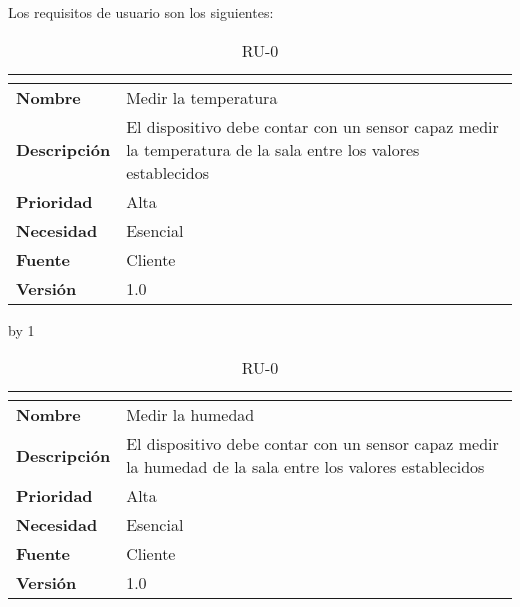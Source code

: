 Los requisitos de usuario son los siguientes:
\newcount\ru
{}
\begin{table}[H]
	\caption{RU-0\number\ru}
	\begin{tabular}{|l|p{}|}
		\hline
		\multicolumn{2}{|c|}{\cellcolor[HTML]{BFBFBF}{\color[HTML]{000000} \textbf{RU-0\number\ru}}} \\ \hline
		\textbf{Nombre}      & Medir la temperatura                                                                                          \\ \hline
		\textbf{Descripción} & El dispositivo debe contar con un sensor capaz medir la temperatura de la sala entre los valores establecidos \\ \hline
		\textbf{Prioridad}   & Alta                                                                                                          \\ \hline
		\textbf{Necesidad}   & Esencial                                                                                                      \\ \hline
		\textbf{Fuente}      & Cliente                                                                                                       \\ \hline
		\textbf{Versión}     & 1.0                                                                                                           \\ \hline
	\end{tabular}
\end{table}
\advance\ru by 1
\begin{table}[H]
	\caption{RU-0\number\ru}
	\begin{tabular}{|l|p{}|}
		\hline
		\multicolumn{2}{|c|}{\cellcolor[HTML]{BFBFBF}{\color[HTML]{000000} \textbf{RU-0\number\ru}}} \\ \hline
		\textbf{Nombre}      & Medir la humedad                                                                                          \\ \hline
		\textbf{Descripción} & El dispositivo debe contar con un sensor capaz medir la humedad de la sala entre los valores establecidos \\ \hline
		\textbf{Prioridad}   & Alta                                                                                                      \\ \hline
		\textbf{Necesidad}   & Esencial                                                                                                  \\ \hline
		\textbf{Fuente}      & Cliente                                                                                                   \\ \hline
		\textbf{Versión}     & 1.0                                                                                                       \\ \hline
	\end{tabular}
\end{table}
